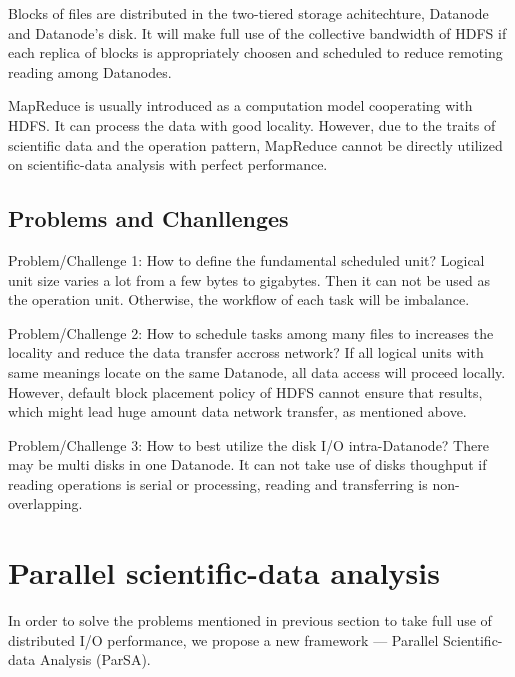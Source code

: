 \documentclass[preprint,12pt]{elsarticle}
\begin{document}
Blocks of files are distributed in the two-tiered storage achitechture, Datanode and Datanode's disk. It will make full use of the
collective bandwidth of HDFS if each replica of blocks is appropriately choosen and scheduled to reduce remoting reading among
Datanodes. \par
MapReduce is usually introduced as a computation model cooperating with HDFS. It can process the data with good locality.
However, due to the traits of scientific data and the operation pattern, MapReduce cannot be directly utilized on scientific-data
analysis with perfect performance.


\subsection{Problems and Chanllenges} 
Problem/Challenge 1: How to define the fundamental scheduled unit? Logical unit size varies a lot from a few bytes to
gigabytes. Then it can not be used as the operation unit. Otherwise, the workflow of each task will be imbalance. \par

Problem/Challenge 2: How to schedule tasks among many files to increases the locality and reduce the data transfer accross network? If all 
logical units with same meanings locate on the same Datanode, all data access will proceed locally. However, default block placement 
policy of HDFS cannot ensure that results, which might lead huge amount data network transfer, as mentioned above. \par

Problem/Challenge 3: How to best utilize the disk I/O intra-Datanode? There may be multi disks in one Datanode. It can not take use of 
disks thoughput if reading operations is serial or processing, reading and transferring is non-overlapping.  

\section{Parallel scientific-data analysis}
In order to solve the problems mentioned in previous section to take full use of distributed I/O performance, we propose a new framework 
--- Parallel Scientific-data Analysis (ParSA). 
\end{document}
